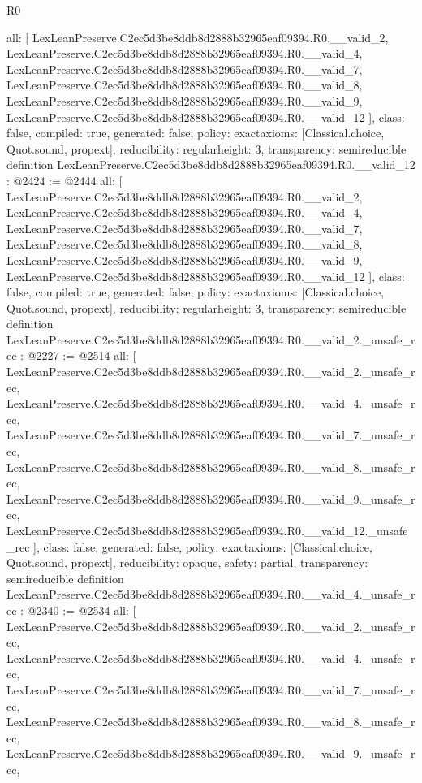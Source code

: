 \begin{lexlean}{R0}
\begin{coremodule}
{  all: [
    LexLeanPreserve.C2ec5d3be8ddb8d2888b32965eaf09394.R0.__valid_2,
    LexLeanPreserve.C2ec5d3be8ddb8d2888b32965eaf09394.R0.__valid_4,
    LexLeanPreserve.C2ec5d3be8ddb8d2888b32965eaf09394.R0.__valid_7,
    LexLeanPreserve.C2ec5d3be8ddb8d2888b32965eaf09394.R0.__valid_8,
    LexLeanPreserve.C2ec5d3be8ddb8d2888b32965eaf09394.R0.__valid_9,
    LexLeanPreserve.C2ec5d3be8ddb8d2888b32965eaf09394.R0.__valid_12
  ],
  class: false,
  compiled: true,
  generated: false,
  policy: exact{axioms: [Classical.choice, Quot.sound, propext]},
  reducibility: regular{height: 3},
  transparency: semireducible
}
definition LexLeanPreserve.C2ec5d3be8ddb8d2888b32965eaf09394.R0.__valid_12 : @2424 := @2444 {
  all: [
    LexLeanPreserve.C2ec5d3be8ddb8d2888b32965eaf09394.R0.__valid_2,
    LexLeanPreserve.C2ec5d3be8ddb8d2888b32965eaf09394.R0.__valid_4,
    LexLeanPreserve.C2ec5d3be8ddb8d2888b32965eaf09394.R0.__valid_7,
    LexLeanPreserve.C2ec5d3be8ddb8d2888b32965eaf09394.R0.__valid_8,
    LexLeanPreserve.C2ec5d3be8ddb8d2888b32965eaf09394.R0.__valid_9,
    LexLeanPreserve.C2ec5d3be8ddb8d2888b32965eaf09394.R0.__valid_12
  ],
  class: false,
  compiled: true,
  generated: false,
  policy: exact{axioms: [Classical.choice, Quot.sound, propext]},
  reducibility: regular{height: 3},
  transparency: semireducible
}
definition LexLeanPreserve.C2ec5d3be8ddb8d2888b32965eaf09394.R0.__valid_2._unsafe_rec : @2227 := @2514 {
  all: [
    LexLeanPreserve.C2ec5d3be8ddb8d2888b32965eaf09394.R0.__valid_2._unsafe_rec,
    LexLeanPreserve.C2ec5d3be8ddb8d2888b32965eaf09394.R0.__valid_4._unsafe_rec,
    LexLeanPreserve.C2ec5d3be8ddb8d2888b32965eaf09394.R0.__valid_7._unsafe_rec,
    LexLeanPreserve.C2ec5d3be8ddb8d2888b32965eaf09394.R0.__valid_8._unsafe_rec,
    LexLeanPreserve.C2ec5d3be8ddb8d2888b32965eaf09394.R0.__valid_9._unsafe_rec,
    LexLeanPreserve.C2ec5d3be8ddb8d2888b32965eaf09394.R0.__valid_12._unsafe_rec
  ],
  class: false,
  generated: false,
  policy: exact{axioms: [Classical.choice, Quot.sound, propext]},
  reducibility: opaque{},
  safety: partial,
  transparency: semireducible
}
definition LexLeanPreserve.C2ec5d3be8ddb8d2888b32965eaf09394.R0.__valid_4._unsafe_rec : @2340 := @2534 {
  all: [
    LexLeanPreserve.C2ec5d3be8ddb8d2888b32965eaf09394.R0.__valid_2._unsafe_rec,
    LexLeanPreserve.C2ec5d3be8ddb8d2888b32965eaf09394.R0.__valid_4._unsafe_rec,
    LexLeanPreserve.C2ec5d3be8ddb8d2888b32965eaf09394.R0.__valid_7._unsafe_rec,
    LexLeanPreserve.C2ec5d3be8ddb8d2888b32965eaf09394.R0.__valid_8._unsafe_rec,
    LexLeanPreserve.C2ec5d3be8ddb8d2888b32965eaf09394.R0.__valid_9._unsafe_rec,
}
\end{coremodule}
\end{lexlean}
